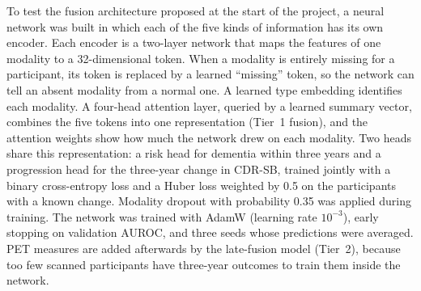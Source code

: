 To test the fusion architecture proposed at the start of the project, a neural network was built in which each of the five kinds of information has its own encoder. Each encoder is a two-layer network that maps the features of one modality to a 32-dimensional token. When a modality is entirely missing for a participant, its token is replaced by a learned ``missing'' token, so the network can tell an absent modality from a normal one. A learned type embedding identifies each modality. A four-head attention layer, queried by a learned summary vector, combines the five tokens into one representation (Tier~1 fusion), and the attention weights show how much the network drew on each modality. Two heads share this representation: a risk head for dementia within three years and a progression head for the three-year change in CDR-SB, trained jointly with a binary cross-entropy loss and a Huber loss weighted by 0.5 on the participants with a known change. Modality dropout with probability 0.35 was applied during training. The network was trained with AdamW (learning rate $10^{-3}$), early stopping on validation AUROC, and three seeds whose predictions were averaged. PET measures are added afterwards by the late-fusion model (Tier~2), because too few scanned participants have three-year outcomes to train them inside the network.

